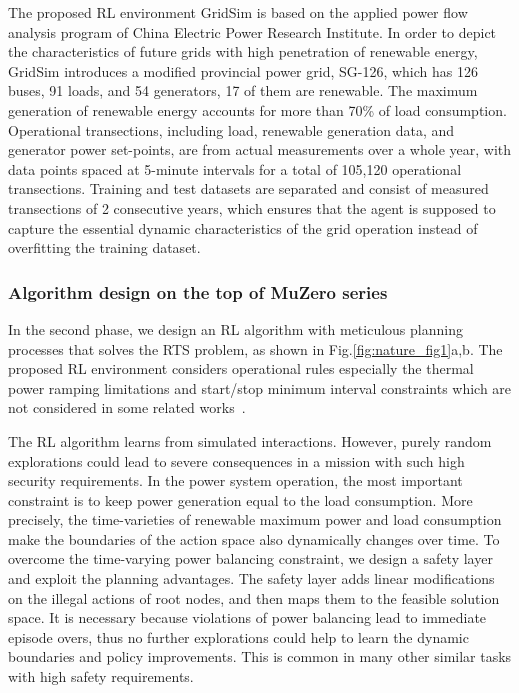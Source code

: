 The proposed RL environment GridSim is based on the applied power flow analysis program of China Electric Power Research Institute. In order to depict the characteristics of future grids with high penetration of renewable energy, GridSim introduces a modified provincial power grid, SG-126, which has 126 buses, 91 loads, and 54 generators, 17 of them are renewable. The maximum generation of renewable energy accounts for more than 70\% of load consumption. Operational transections, including load, renewable generation data, and generator power set-points, are from actual measurements over a whole year, with data points spaced at 5-minute intervals for a total of 105,120 operational transections. Training and test datasets are separated and consist of measured transections of 2 consecutive years, which ensures that the agent is supposed to capture the essential dynamic characteristics of the grid operation instead of overfitting the training dataset. 


\subsubsection*{Algorithm design on the top of MuZero series}
In the second phase, we design an RL algorithm with meticulous planning processes that solves the RTS problem,
as shown in Fig.\ref{fig:nature_fig1}a,b. The proposed RL environment considers operational rules especially the thermal power ramping limitations and start/stop minimum interval constraints which are not considered in some related works~\cite{zhou2021deep,yan2020real}.

The RL algorithm learns from simulated interactions. However, purely random explorations could lead to severe consequences in a mission with such high security requirements. In the power system operation, the most important constraint is to keep power generation equal to the load consumption. More precisely, the time-varieties of renewable maximum power and load consumption make the boundaries of the action space also dynamically changes over time. To overcome the time-varying power balancing constraint, we design a safety layer and exploit the planning advantages. The safety layer adds linear modifications on the illegal actions of root nodes, and then maps them to the feasible solution space. It is necessary because violations of power balancing lead to immediate episode overs, thus no further explorations could help to learn the dynamic boundaries and policy improvements. This is common in many other similar tasks with high safety requirements. 

